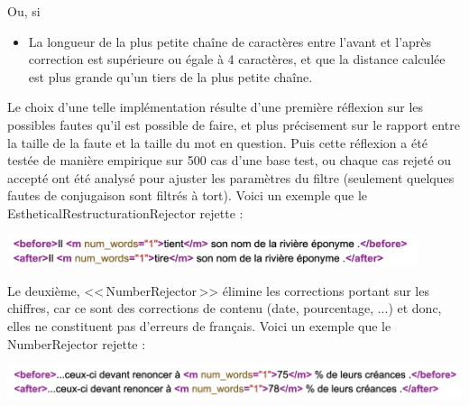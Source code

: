 \documentclass[11pt]{article}
\begin{document}
Ou, si
\begin{itemize}
\item La longueur de la plus petite cha\^{i}ne de caract\`{e}res entre l'avant et l'apr\`{e}s correction est sup\'{e}rieure ou \'{e}gale \`{a} 4 caract\`{e}res, et que la distance calcul\'{e}e est plus grande qu'un tiers de la plus petite cha\^{i}ne.
\end{itemize}
 Le choix d'une telle impl\'{e}mentation r\'{e}sulte d'une premi\`{e}re r\'{e}flexion sur les possibles fautes qu'il est possible de faire, et plus pr\'{e}cisement sur le rapport entre la taille de la faute et la taille du mot en question. Puis cette r\'{e}flexion a \'{e}t\'{e} test\'{e}e de mani\`{e}re empirique sur 500 cas d'une base test, ou chaque cas rejet\'{e} ou accept\'{e} ont \'{e}t\'{e} analys\'{e} pour ajuster les param\`{e}tres du filtre (seulement quelques fautes de conjugaison sont filtr\'{e}s \`{a} tort).
 Voici un exemple que le EstheticalRestructurationRejector rejette :

\begin{center}
\includegraphics[width=12cm]{exemple12.png} %
\end{center}
Le deuxi\`{e}me, <<\,NumberRejector\,>> \'{e}limine les corrections portant sur les chiffres, car ce sont des corrections de contenu (date, pourcentage, ...) et donc, elles ne constituent pas d'erreurs de fran\c{c}ais. 
Voici un exemple que le NumberRejector rejette :
\begin{center}
\includegraphics[width=14cm]{exemple13.png} %
\end{center}

\end{document}
